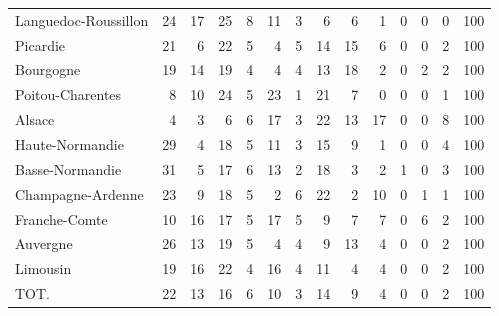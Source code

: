 \documentclass[11pt]{article}
\begin{document}
\begin{table}[H]
\begin{tabular}{lrrrrrrrrrrrrr}
Languedoc-Roussillon &         24 &         17 &         25 &          8 &         11 &          3 &          6 &          6 &          1 &          0 &          0 &          0 &        100 \\
Picardie             &         21 &          6 &         22 &          5 &          4 &          5 &         14 &         15 &          6 &          0 &          0 &          2 &        100 \\
Bourgogne            &         19 &         14 &         19 &          4 &          4 &          4 &         13 &         18 &          2 &          0 &          2 &          2 &        100 \\
Poitou-Charentes     &          8 &         10 &         24 &          5 &         23 &          1 &         21 &          7 &          0 &          0 &          0 &          1 &        100 \\
Alsace               &          4 &          3 &          6 &          6 &         17 &          3 &         22 &         13 &         17 &          0 &          0 &          8 &        100 \\
Haute-Normandie      &         29 &          4 &         18 &          5 &         11 &          3 &         15 &          9 &          1 &          0 &          0 &          4 &        100 \\
Basse-Normandie      &         31 &          5 &         17 &          6 &         13 &          2 &         18 &          3 &          2 &          1 &          0 &          3 &        100 \\
Champagne-Ardenne    &         23 &          9 &         18 &          5 &          2 &          6 &         22 &          2 &         10 &          0 &          1 &          1 &        100 \\
Franche-Comte        &         10 &         16 &         17 &          5 &         17 &          5 &          9 &          7 &          7 &          0 &          6 &          2 &        100 \\
Auvergne             &         26 &         13 &         19 &          5 &          4 &          4 &          9 &         13 &          4 &          0 &          0 &          2 &        100 \\
Limousin             &         19 &         16 &         22 &          4 &         16 &          4 &         11 &          4 &          4 &          0 &          0 &          2 &        100 \\
TOT.                 &         22 &         13 &         16 &          6 &         10 &          3 &         14 &          9 &          4 &          0 &          0 &          2 &        100 \\
\bottomrule
\end{tabular}

\end{table}
\end{document}

